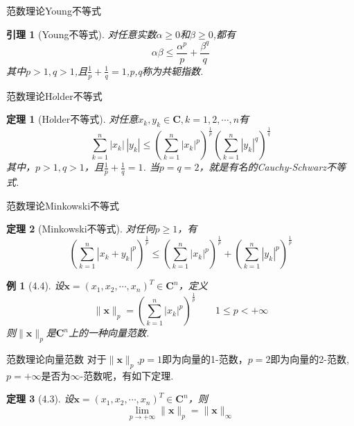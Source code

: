 \documentclass{sintefbeamer}[dark]
\newtheorem*{例}{例}
\newtheorem*{定理}{定理}
\newtheorem{引理}{引理}
\begin{document}
\begin{frame}{范数理论}{Young不等式}
	\begin{引理}[Young不等式]
		对任意实数$\alpha \ge 0$和$\beta \ge 0$,都有
		$$
		\alpha \beta \le \frac{\alpha ^{p} }{p}+\frac{\beta ^{q} }{q}  
		$$
		\linebreak
		其中$p>1,q>1$,且$\frac{1}{p} +\frac{1}{q} =1$,p,q称为共轭指数.
		
		\end{引理}
\end{frame}

\begin{frame}{范数理论}{H$\ddot{o}$lder不等式}
	\begin{定理}[H$\ddot{o}$lder不等式]
		对任意$x_{k},y_{k}\in\mathbf{C},k=1,2,\cdots,n$有
		$$
	    \sum_{k=1}^{n}|x_{k}|\,|y_{k}|\le (\sum_{k=1}^{n}|x_{k}|^{p} )^{\frac{1}{p}}(\sum_{k=1}^{n}|y_{k}|^{q} )^{\frac{1}{q} } 
		$$
		\linebreak
		其中，$p>1,q>1$，且$\frac{1}{p}+\frac{1}{q} =1$.
		\pause
		当$p=q=2$，就是有名的Cauchy-Schwarz不等式.
		\end{定理}
\end{frame}

\begin{frame}{范数理论}{Minkowski不等式}
	\begin{定理}[Minkowski不等式]
		对任何$p\ge1 $，有
		$$
		(\sum_{k=1}^{n}|x_{k}+y_{k}|^{p} )^{\frac{1}{p} }\le (\sum_{k=1}^{n}|x_{k}|^{p} )^{\frac{1}{p} }+ (\sum_{k=1}^{n}|y_{k}|^{p} )^{\frac{1}{p} }
		$$
		\end{定理}
	\pause
	\begin{例}[4.4]
		设$\bm{x}=(x_{1},x_{2},\cdots,x_{n})^{T}\in\mathbf{C}^{n}$，定义
		$$
		\|\bm{x}\|_{p}=(\sum_{k=1}^{n}|x_{k}|^{p})^{\frac{1}{p}}\qquad 1\le p<+\infty
		$$
		\linebreak
		则$\|\bm{x}\|_{p}$是$\mathbf{C}^{n}$上的一种向量范数.
		\end{例}
	\end{frame}

\begin{frame}{范数理论}{向量范数}
	\qquad
	对于$\|\bm{x}\|_{p}$,$p=1$即为向量的1-范数，$p=2$即为向量的2-范数,$p=+\infty$是否为$\infty$-范数呢，有如下定理.
	\begin{定理}[4.3]
		设$\bm{x}=(x_{1},x_{2},\cdots,x_{n})^{T}\in\mathbf{C}^{n}$，则
		$$
		\lim_{p \to +\infty}\|\bm{x}\|_{p}=\|\bm{x}\|_{\infty}
		$$
		\end{定理}
\end{frame}
\end{document}
